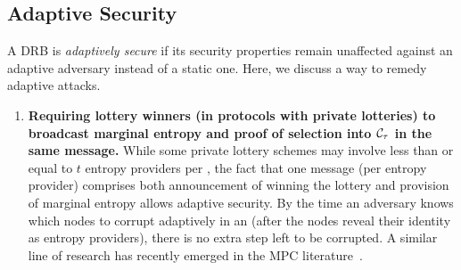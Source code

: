\subsection{Adaptive Security}
\label{subsection:adaptive}
A DRB is \textit{adaptively secure} if its security properties remain unaffected against an adaptive adversary instead of a static one.
Here, we discuss a way to remedy adaptive attacks.

\begin{enumerate}
\item \textbf{Requiring lottery winners (in protocols with private lotteries) to broadcast marginal entropy and proof of selection into $\mathcal{C}_\tau$ in the same message.} While some private lottery schemes may involve less than or equal to $t$ entropy providers per \epoch, the fact that one message (per entropy provider) comprises both announcement of winning the lottery and provision of marginal entropy allows adaptive security. By the time an adversary knows which nodes to corrupt adaptively in an \epoch (after the nodes reveal their identity as entropy providers), there is no extra step left to be corrupted. A similar line of research has recently emerged in the MPC literature~\cite{gentry2021yoso}.
\end{enumerate}

